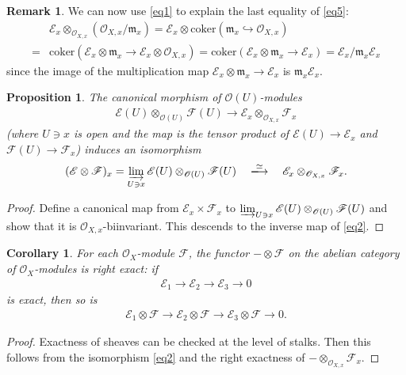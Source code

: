 \documentclass[12pt,b5paper,notitlepage]{report}
\theoremstyle{definition}
\newtheorem{rem}[df]{Remark}
\theoremstyle{plain}
\newtheorem{pp}[df]{Proposition}
\newtheorem{co}[df]{Corollary}
\newcommand{\fk}{\mathfrak}
\newcommand{\scr}{\mathscr}
\newcommand{\coker}{\mathrm{coker}}
\numberwithin{equation}{section}
\begin{document}
\begin{rem}\label{lb4}
We can now use \eqref{eq1} to explain the last equality of \eqref{eq5}:
\begin{align*}
&\scr E_x\otimes_{\scr O_{X,x}}(\scr O_{X,x}/\fk m_x)=\scr E_x\otimes \coker(\fk m_x\hookrightarrow \scr O_{X,x})\\
=&\coker(\scr E_x\otimes\fk m_x\rightarrow \scr E_x\otimes\scr O_{X,x})=\coker(\scr E_x\otimes\fk m_x\rightarrow \scr E_x)=\scr E_x/{\fk m_x\scr E_x}
\end{align*}
since the image of the multiplication map $\scr E_x\otimes\fk m_x\rightarrow \scr E_x$ is $\fk m_x\scr E_x$.
\end{rem}


\begin{pp}
The canonical morphism of $\scr O(U)$-modules
\begin{align*}
\scr E(U)\otimes_{\scr O(U)}\scr F(U)\rightarrow\scr E_x\otimes_{\scr O_{X,x}}\scr F_x
\end{align*}
(where $U\ni x$ is open and the map is the tensor product of $\scr E(U)\rightarrow\scr E_x$ and $\scr F(U)\rightarrow\scr F_x$) induces an isomorphism
\begin{align}
(\scr E\otimes\scr F)_x=\varinjlim_{U\ni x}\scr E(U)\otimes_{\scr O(U)}\scr F(U)\quad\xlongrightarrow{\simeq}\quad\scr E_x\otimes_{\scr O_{X,x}}\scr F_x.\label{eq2}
\end{align}
\end{pp}
\begin{proof}
Define a canonical map from $\scr E_x\times\scr F_x$ to $\varinjlim_{U\ni x}\scr E(U)\otimes_{\scr O(U)}\scr F(U)$ and show that it is $\scr O_{X,x}$-biinvariant.  This descends to the inverse map of \eqref{eq2}.
\end{proof}

\begin{co}
For each $\scr O_X$-module $\scr F$, the functor $-\otimes\scr F$ on the abelian category of $\scr O_X$-modules is right exact: if
\begin{align*}
\scr E_1\rightarrow\scr E_2\rightarrow\scr E_3\rightarrow 0
\end{align*}
is exact, then so is
\begin{align*}
\scr E_1\otimes\scr F\rightarrow\scr E_2\otimes\scr F\rightarrow\scr E_3\otimes\scr F\rightarrow 0.
\end{align*}
\end{co}

\begin{proof}
Exactness of sheaves can be checked at the level of stalks. Then this follows from the isomorphism \eqref{eq2} and the right exactness of $-\otimes_{\scr O_{X,x}}\scr F_x$.
\end{proof}
\end{document}
